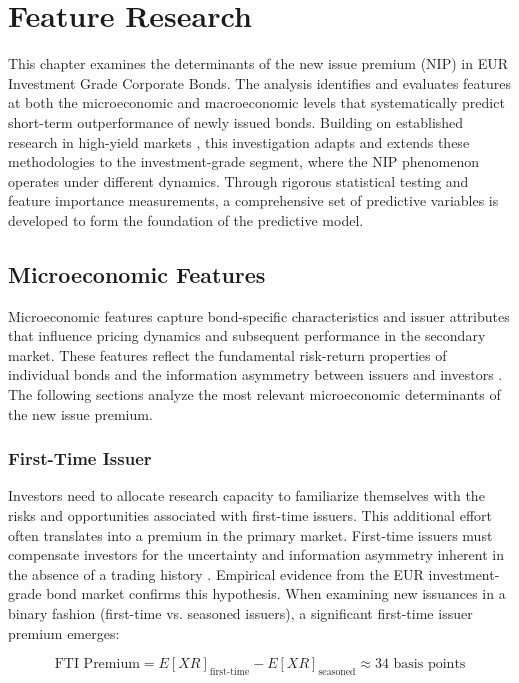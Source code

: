 \chapter{Feature Research}
\label{ch:feature_research}

This chapter examines the determinants of the new issue premium (NIP) in EUR Investment Grade Corporate Bonds. The analysis identifies and evaluates features at both the microeconomic and macroeconomic levels that systematically predict short-term outperformance of newly issued bonds. Building on established research in high-yield markets \parencite{Geerts2022PredictingYield}, this investigation adapts and extends these methodologies to the investment-grade segment, where the NIP phenomenon operates under different dynamics. Through rigorous statistical testing and feature importance measurements, a comprehensive set of predictive variables is developed to form the foundation of the predictive model.

\section{Microeconomic Features}

Microeconomic features capture bond-specific characteristics and issuer attributes that influence pricing dynamics and subsequent performance in the secondary market. These features reflect the fundamental risk-return properties of individual bonds and the information asymmetry between issuers and investors \parencite{Geerts2022PredictingYield}. The following sections analyze the most relevant microeconomic determinants of the new issue premium.

\subsection{First-Time Issuer}
Investors need to allocate research capacity to familiarize themselves with the risks and opportunities associated with first-time issuers. This additional effort often translates into a premium in the primary market. First-time issuers must compensate investors for the uncertainty and information asymmetry inherent in the absence of a trading history \parencite{Geerts2022PredictingYield}. Empirical evidence from the EUR investment-grade bond market confirms this hypothesis. When examining new issuances in a binary fashion (first-time vs. seasoned issuers), a significant first-time issuer premium emerges:

$$\text{FTI Premium} = E[XR]_{\text{first-time}} - E[XR]_{\text{seasoned}} \approx 34 \text{ basis points}$$

